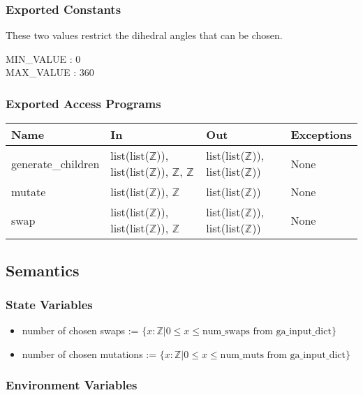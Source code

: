 \documentclass[12pt, titlepage]{article}
\begin{document}
\subsubsection{Exported Constants}

These two values restrict the dihedral angles that can be chosen.

MIN\_VALUE : 0\\
\indent MAX\_VALUE : 360

\subsubsection{Exported Access Programs}

\begin{center}
	\begin{tabular}{p{3.5cm} p{4cm} p{3cm} p{2cm}}
		\hline
		\textbf{Name} & \textbf{In} & \textbf{Out} & \textbf{Exceptions} \\
		\hline
		generate\_children & list(list($\mathbb{Z}$)), 
		list(list($\mathbb{Z}$)), $\mathbb{Z}$, $\mathbb{Z}$ & 
		list(list($\mathbb{Z}$)), list(list($\mathbb{Z}$)) & None \\
		mutate & list(list($\mathbb{Z}$)), $\mathbb{Z}$ & 
		list(list($\mathbb{Z}$)) & None \\
		swap & list(list($\mathbb{Z}$)), 
		list(list($\mathbb{Z}$)), $\mathbb{Z}$ & list(list($\mathbb{Z}$)), 
		list(list($\mathbb{Z}$)) & None \\
		\hline
	\end{tabular}
\end{center}

\subsection{Semantics}

\subsubsection{State Variables}

\begin{itemize}
	\item number of chosen swaps := $\{ x : \mathbb{Z} | 0 \leq x \leq 
	\text{num\_swaps from ga\_input\_dict}\}$
	\item number of chosen mutations := $\{ x : \mathbb{Z} | 0 \leq x \leq 
	\text{num\_muts from ga\_input\_dict}\}$
\end{itemize}

\subsubsection{Environment Variables}
\end{document}
